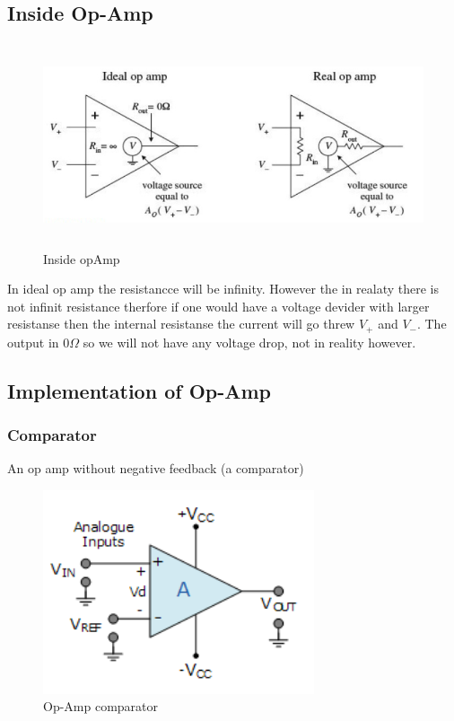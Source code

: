 \documentclass{article}
\begin{document}
\subsection{Inside Op-Amp}
\begin{figure}[h]
    \vspace{10mm}
    \centering
    \includegraphics[width=12cm, height=6cm]{image/inside-opamp.png}
    \caption{Inside opAmp}
\end{figure}
In ideal op amp the resistancce will be infinity. However the in realaty
there is not infinit resistance therfore if one would have a voltage devider
with larger resistanse then the internal resistanse the current will 
go threw $V_+$ and $V_-$. The output in $0\Omega$ so we will not have any
voltage drop, not in reality however.

\newpage
\subsection{Implementation of Op-Amp}
\subsubsection{Comparator}
An op amp without negative feedback (a comparator)
\begin{figure}[h]
    \vspace{10mm}
    \centering
    \includegraphics[width=8cm, height=6cm]{image/op-amp-comparator.png}
    \caption{Op-Amp comparator}
\end{figure}
\end{document}
